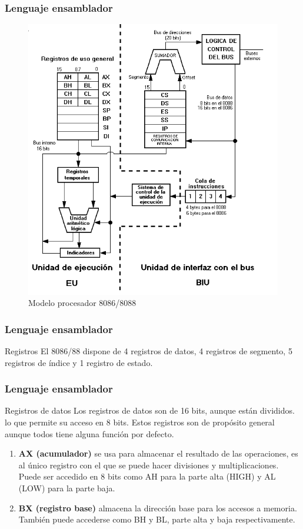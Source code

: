 \documentclass{beamer}
\begin{document}
\begin{frame}
	\frametitle{Lenguaje ensamblador}
	\begin{figure}[H]
	\centering
	\includegraphics[scale=0.3]{imagenes/8088.png}
	\caption{Modelo procesador 8086/8088}
	\end{figure}			
\end{frame}



\begin{frame}
	\frametitle{Lenguaje ensamblador}
	\begin{block}{Registros}
		El 8086/88 dispone de 4 registros de datos, 4 registros de segmento, 5 registros de índice y 1
registro de estado.
	\end{block}		 		
\end{frame}

\begin{frame}
	\frametitle{Lenguaje ensamblador}
	\begin{block}{Registros de datos} \justify
			Los registros de datos son de 16 bits, aunque están divididos. lo que permite su acceso en 8 bits. Estos registros son de propósito general aunque todos tiene alguna función por defecto. 
			\begin{enumerate}
				\item \textbf{AX (acumulador)} se usa para almacenar el resultado de las operaciones, es al único registro con el que se puede hacer divisiones y multiplicaciones. Puede ser accedido en 8 bits como AH para la parte alta (HIGH) y AL (LOW) para la parte baja. 
				\item \textbf{BX (registro base)} almacena la dirección base para los accesos a memoria. También puede accederse como BH y BL, parte alta y baja respectivamente.
			\end{enumerate}
	\end{block}		 		
\end{frame}
\end{document}
